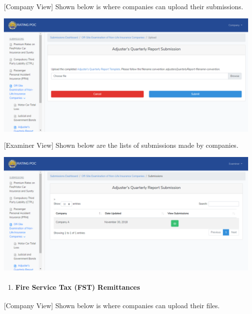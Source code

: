 \documentclass{article}
\begin{document}
\noindent{}[Company View] Shown below is where companies can
upload their submissions.%

\includegraphics[keepaspectratio=true]{up-ic-screens/image51}{}%

[Examiner View] Shown below are the lists of
submissions made by companies.%

\includegraphics[keepaspectratio=true]{up-ic-screens/image4}{}%

\begin{enumerate}[noitemsep,topsep=\mdcompacttopsep]%

\item{}
\paragraph{Fire Service Tax (FST) Remittances}\label{sec-fire-service-tax-fst-remittances}%
\end{enumerate}%

\noindent{}[Company View] Shown below is where companies can
upload their files.%
\end{document}
